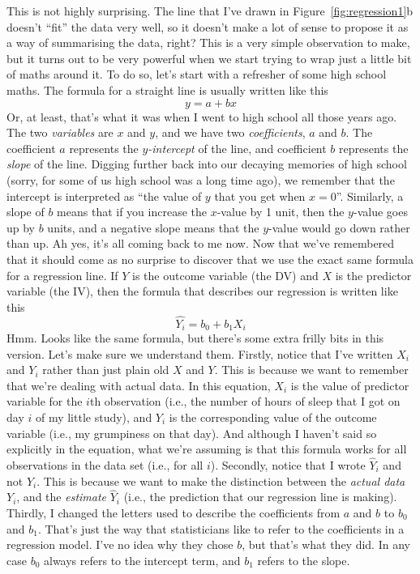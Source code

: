 This is not highly surprising. The line that I've drawn in Figure~\ref{fig:regression1}b doesn't ``fit'' the data very well, so it doesn't make a lot of sense to propose it as a way of summarising the data, right? This is a very simple observation to make, but it turns out to be very powerful when we start trying to wrap just a little bit of maths around it. To do so, let's start with a refresher of some high school maths. The formula for a straight line is usually written like this
$$
y = a + bx 
$$ 
Or, at least, that's what it was when I went to high school all those years ago. The two {\it variables} are $x$ and $y$, and we have two {\it coefficients}, $a$ and $b$. The coefficient $a$ represents the {\it $y$-intercept} of the line, and coefficient $b$ represents the {\it slope} of the line. Digging further back into our decaying memories of high school (sorry, for some of us high school was a long time ago), we remember that the intercept is interpreted as ``the value of $y$ that you get when $x=0$''. Similarly, a slope of $b$ means that if you increase the $x$-value by 1 unit, then the $y$-value goes up by $b$ units, and a negative slope means that the $y$-value would go down rather than up. Ah yes, it's all coming back to me now. Now that we've remembered that it should come as no surprise to discover that we use the exact same formula for a regression line. If $Y$ is the outcome variable (the DV) and $X$ is the predictor variable (the IV), then the formula that describes our regression is written like this
$$
\hat{Y_i} = b_0 + b_1 X_i 
$$
Hmm. Looks like the same formula, but there's some extra frilly bits in this version. Let's make sure we understand them. Firstly, notice that I've written $X_i$ and $Y_i$ rather than just plain old $X$ and $Y$. This is because we want to remember that we're dealing with actual data. In this equation, $X_i$ is the value of predictor variable for the $i$th observation (i.e., the number of hours of sleep that I got on day $i$ of my little study), and $Y_i$ is the corresponding value of the outcome variable (i.e., my grumpiness on that day). And although I haven't said so explicitly in the equation, what we're assuming is that this formula works for all observations in the data set (i.e., for all $i$). Secondly, notice that I wrote $\hat{Y}_i$ and not $Y_i$. This is because we want to make the distinction between the {\it actual data} $Y_i$, and the {\it estimate} $\hat{Y}_i$ (i.e., the prediction that our regression line is making). Thirdly, I changed the letters used to describe the coefficients from $a$ and $b$ to $b_0$ and $b_1$. That's just the way that statisticians like to refer to the coefficients in a regression model. I've no idea why they chose $b$, but that's what they did. In any case $b_0$ always refers to the intercept term, and $b_1$ refers to the slope.

